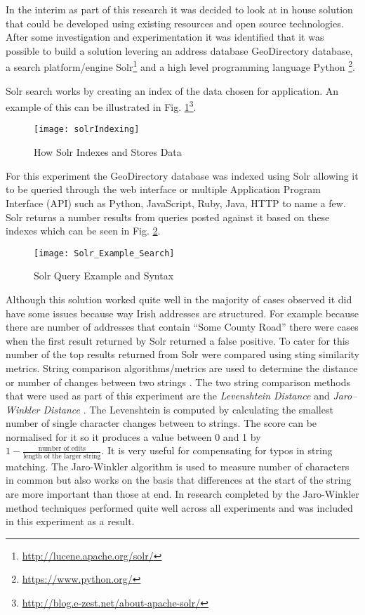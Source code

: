 In the interim as part of this research it was decided to look at in house solution that could be developed using existing resources and open source technologies. After some investigation and experimentation it was identified that it was possible to build a solution levering an address database GeoDirectory database, a search platform/engine Solr\footnote{\url{http://lucene.apache.org/solr/}} and a high level programming language Python \footnote{\url{https://www.python.org/}}.


Solr search works by creating an index of the data chosen for application. An example of this can be illustrated in Fig. \ref{fig:solrIndexing}\footnote{\url{http://blog.e-zest.net/about-apache-solr/}}. 

\begin{figure}[H]
	\texttt{[image: solrIndexing]}
	\caption[Illustration of Inverted Indexing]
	{How Solr Indexes and Stores Data}
	\label{fig:solrIndexing}
\end{figure}

For this experiment the GeoDirectory database was indexed using Solr allowing it to be queried through the web interface or multiple Application Program Interface (API) such as Python, JavaScript, Ruby, Java, HTTP to name a few. Solr returns a number results from queries posted against it based on these indexes which can be seen in Fig. \ref{fig:Solr_Example_Search from Web Interface}.

\begin{figure}[H]
	\texttt{[image: Solr\_Example\_Search]}
	\caption{Solr Query Example and Syntax}
	\label{fig:Solr_Example_Search from Web Interface}
\end{figure}

Although this solution worked quite well in the majority of cases observed it did have some issues because way Irish addresses are structured. For example because there are number of addresses that contain ``Some County Road'' there were cases when the first result returned by Solr returned a false positive. To cater for this number of the top results returned from Solr were compared using sting similarity metrics. String comparison algorithms/metrics are used to determine the distance or number of changes between two strings \citep{wagner_string--string_1974}. The two string comparison methods that were used as part of this experiment are the \textit{Levenshtein Distance} \citep{levenshtein_binary_1966} and \textit{Jaro–Winkler Distance} \citep{winkler_string_1990}. The Levenshtein is computed by calculating the smallest number of single character changes between to strings. The score can be normalised for it so it produces a value between 0 and 1 by $1 -\frac{\text{number of edits}}{\text{length of the larger string}}$. It is very useful for compensating for typos in string matching. The Jaro-Winkler algorithm is used to measure number of characters in common but also works on the basis that differences at the start of the string are more important than those at end. In research completed by \cite{christen_comparison_2006} the Jaro-Winkler method techniques performed quite well across all experiments and was included in this experiment as a result. 

